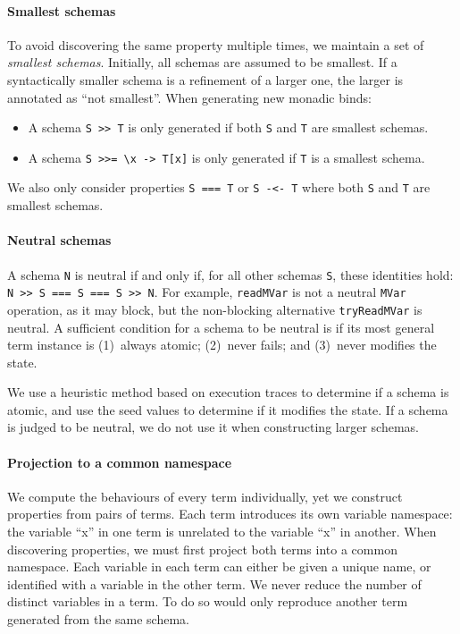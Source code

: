 \paragraph{Smallest schemas}
To avoid discovering the same property multiple times, we maintain a
set of \emph{smallest schemas}.  Initially, all schemas are assumed to
be smallest.  If a syntactically smaller schema is a refinement of a
larger one, the larger is annotated as ``not smallest''.  When
generating new monadic binds:

\begin{itemize}
\item A schema \verb|S >> T| is only generated if both \verb|S| and
  \verb|T| are smallest schemas.
\item A schema \verb|S >>= \x -> T[x]| is only generated if \verb|T|
  is a smallest schema.
\end{itemize}

We also only consider properties \verb|S === T| or \verb|S -<- T|
where both \verb|S| and \verb|T| are smallest schemas.

\paragraph{Neutral schemas}
A schema \verb|N| is neutral if and only if, for all other schemas
\verb|S|, these identities hold: \verb|N >> S === S === S >> N|.  For
example, \verb|readMVar| is not a neutral \verb|MVar| operation, as it
may block, but the non-blocking alternative \verb|tryReadMVar| is
neutral.  A sufficient condition for a schema to be neutral is if its
most general term instance is (1)~always atomic; (2)~never fails; and
(3)~never modifies the state.

We use a heuristic method based on execution traces to determine if a
schema is atomic, and use the seed values to determine if it modifies
the state.  If a schema is judged to be neutral, we do not use it when
constructing larger schemas.

\paragraph{Projection to a common namespace}
We compute the behaviours of every term individually, yet we construct
properties from pairs of terms.  Each term introduces its own variable
namespace: the variable ``x'' in one term is unrelated to the variable
``x'' in another.  When discovering properties, we must first project
both terms into a common namespace.  Each variable in each term can
either be given a unique name, or identified with a variable in the
other term.  We never reduce the number of distinct variables in a
term.  To do so would only reproduce another term generated from the
same schema.

